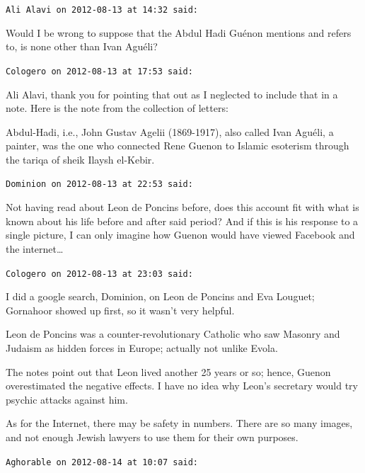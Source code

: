 \begin{footnotesize}\begin{sffamily}



\texttt{Ali Alavi on 2012-08-13 at 14:32 said: }

Would I be wrong to suppose that the Abdul Hadi Guénon mentions and refers to, is none other than Ivan Aguéli?


\hfill

\texttt{Cologero on 2012-08-13 at 17:53 said: }

Ali Alavi, thank you for pointing that out as I neglected to include that in a note. Here is the note from the collection of letters:

\begin{quotex}
Abdul-Hadi, i.e., John Gustav Agelii (1869-1917), also called Ivan Aguéli, a painter, was the one who connected Rene Guenon to Islamic esoterism through the tariqa of sheik Ilaysh el-Kebir. 

\end{quotex}

\hfill

\texttt{Dominion on 2012-08-13 at 22:53 said: }

Not having read about Leon de Poncins before, does this account fit with what is known about his life before and after said period? And if this is his response to a single picture, I can only imagine how Guenon would have viewed Facebook and the internet…


\hfill

\texttt{Cologero on 2012-08-13 at 23:03 said: }

I did a google search, Dominion, on Leon de Poncins and Eva Louguet; Gornahoor showed up first, so it wasn't very helpful.

Leon de Poncins was a counter-revolutionary Catholic who saw Masonry and Judaism as hidden forces in Europe; actually not unlike Evola.

The notes point out that Leon lived another 25 years or so; hence, Guenon overestimated the negative effects. I have no idea why Leon's secretary would try psychic attacks against him.

As for the Internet, there may be safety in numbers. There are so many images, and not enough Jewish lawyers to use them for their own purposes.


\hfill

\texttt{Aghorable on 2012-08-14 at 10:07 said: }


\end{sffamily}
\end{footnotesize}
